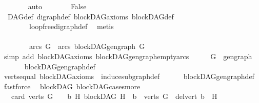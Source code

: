 \begin{isabellebody}
\ \ \ \ \ \ \isamarkupfalse%
\ auto\isanewline
\ \ \ \ \isamarkupfalse%
\ \isamarkupfalse%
\ False\isanewline
\ \ \ \ \ \ \isamarkupfalse%
\ \ DAG{\isacharunderscore}{\kern0pt}def\ digraph{\isacharunderscore}{\kern0pt}def\ blockDAG{\isacharunderscore}{\kern0pt}axioms\ blockDAG{\isacharunderscore}{\kern0pt}def\isanewline
\ \ \ \ \ \ \ \ loopfree{\isacharunderscore}{\kern0pt}digraph{\isacharunderscore}{\kern0pt}def\ \isamarkupfalse%
\ metis\isanewline
\ \ \isamarkupfalse%
\ \ \ \ \ \ \ \ \ \ \ \ \ \ \ \ \ \ \ \ \ \ \ \ \ \ \ \ \ \ \ \ \ \ \ \ \ \ \ \ \ \ \ \ \ \ \ \ \ \ \ \ \ \ \ \ \ \ \ \ \ \ \ \ \ \ \ \ \ \ \ \ \ \ \isanewline
\ \ \isamarkupfalse%
\ \isamarkupfalse%
\ {\isachardoublequoteopen}arcs\ G\ {\isacharequal}{\kern0pt}\ arcs\ {\isacharparenleft}{\kern0pt}blockDAG{\isachardot}{\kern0pt}gen{\isacharunderscore}{\kern0pt}graph\ G{\isacharparenright}{\kern0pt}{\isachardoublequoteclose}\isanewline
\ \ \ \ \isamarkupfalse%
\ {\isacharparenleft}{\kern0pt}simp\ add{\isacharcolon}{\kern0pt}\ blockDAG{\isacharunderscore}{\kern0pt}axioms\ blockDAG{\isachardot}{\kern0pt}gen{\isacharunderscore}{\kern0pt}graph{\isacharunderscore}{\kern0pt}empty{\isacharunderscore}{\kern0pt}arcs{\isacharparenright}{\kern0pt}\isanewline
\ \ \isamarkupfalse%
\ \isamarkupfalse%
\ {\isachardoublequoteopen}G\ {\isacharequal}{\kern0pt}\ gen{\isacharunderscore}{\kern0pt}graph{\isachardoublequoteclose}\isanewline
\ \ \ \ \isamarkupfalse%
\ \ blockDAG{\isachardot}{\kern0pt}gen{\isacharunderscore}{\kern0pt}graph{\isacharunderscore}{\kern0pt}def\isanewline
\ \ \ \ \isamarkupfalse%
\ verts{\isacharunderscore}{\kern0pt}equal\ blockDAG{\isacharunderscore}{\kern0pt}axioms\ \ induce{\isacharunderscore}{\kern0pt}subgraph{\isacharunderscore}{\kern0pt}def\isanewline
\ \ \ \ \ \ blockDAG{\isachardot}{\kern0pt}gen{\isacharunderscore}{\kern0pt}graph{\isacharunderscore}{\kern0pt}def\ \isamarkupfalse%
\ fastforce\isanewline
{}\isamarkupfalse%
%
\endisatagproof
{\isafoldproof}%
%
\isadelimproof
\isanewline
%
\endisadelimproof
\isanewline
{}\isamarkupfalse%
\ {\isacharparenleft}{\kern0pt}\ blockDAG{\isacharparenright}{\kern0pt}\ blockDAG{\isacharunderscore}{\kern0pt}cases{\isacharunderscore}{\kern0pt}more{\isacharcolon}{\kern0pt}\isanewline
\ \ \ {\isachardoublequoteopen}card\ {\isacharparenleft}{\kern0pt}verts\ G{\isacharparenright}{\kern0pt}\ {\isachargreater}{\kern0pt}\ {}\ {\isasymlongleftrightarrow}\ {\isacharparenleft}{\kern0pt}{\isasymexists}b\ H{\isachardot}{\kern0pt}\ {\isacharparenleft}{\kern0pt}blockDAG\ H\ {\isasymand}\ b\ {\isasymin}\ verts\ G\ {\isasymand}\ del{\isacharunderscore}{\kern0pt}vert\ b\ {\isacharequal}{\kern0pt}\ H{\isacharparenright}{\kern0pt}{\isacharparenright}{\kern0pt}{\isachardoublequoteclose}\isanewline

\end{isabellebody}

